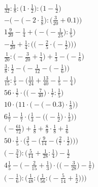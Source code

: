 \documentclass[8pt]{article}
\begin{document}
\begin{align}
\frac{1}{32} : \frac{1}{8} : \big(1 \cdot \frac{1}{2}\big) : \big(1 - \frac{1}{2}\big) \\
-\Big(-\big(-2 \cdot \frac{1}{8}\big) : \big(\frac{3}{20} + 0.1\big)\Big) \\
1\frac{9}{20} - \frac{1}{4} + \Big(-\big(-\frac{1}{25}\big) : \frac{1}{5}\Big) \\
-\frac{1}{20} + \frac{1}{4} : \bigg(\Big(-\frac{2}{5} \cdot \big(-\frac{1}{2}\big)\Big)\bigg) \\
\frac{1}{20} : \big(-\frac{3}{20} + \frac{1}{4}\big) + \frac{1}{3} - \big(-\frac{1}{6}\big) \\
\frac{3}{8} : \frac{1}{2} - \Big(-\frac{1}{12} - \big(-\frac{1}{6}\big)\Big) \\
\frac{4}{15} : \frac{1}{5} - \big(\frac{11}{24} + \frac{13}{40} - \frac{1}{5} - \frac{1}{4}\big) \\
56 \cdot \frac{1}{7} \cdot \Big(\big(-\frac{7}{40}\big) \cdot \frac{1}{7} : \frac{1}{5}\Big) \\
10 \cdot \bigg(11 \cdot \Big(-\big(-0.3\big) \cdot \frac{1}{3}\Big)\bigg) \\
6\frac{1}{7} - \frac{1}{7} \cdot \bigg(\frac{1}{3} - \Big(\big(-\frac{1}{2}\big) \cdot \frac{1}{3}\Big)\bigg) \\
\big(-\frac{61}{72}\big) + \frac{1}{8} + \frac{8}{9} \cdot \frac{1}{8} + \frac{1}{6} \\
50 \cdot \frac{1}{5} \cdot \bigg(\frac{3}{5} - \Big(\frac{9}{14} - \big(\frac{2}{7} \cdot \frac{1}{2}\big)\Big)\bigg) \\
\big(-\frac{3}{4}\big) : \big(\frac{5}{14} + \frac{1}{28} : \frac{1}{4}\big) - \frac{1}{2} \\
4\frac{1}{5} - \Big(-\frac{2}{15} + \frac{1}{3}\Big) \cdot \Big(\big(-\frac{3}{28}\big) - \frac{1}{7}\Big) \\
\bigg(-\frac{1}{6}\bigg) : \bigg(\frac{1}{48} : \Big(\frac{1}{56} : \big(-\frac{5}{14} + \frac{1}{2}\big)\Big)\bigg)
\end{align}
\end{document}
